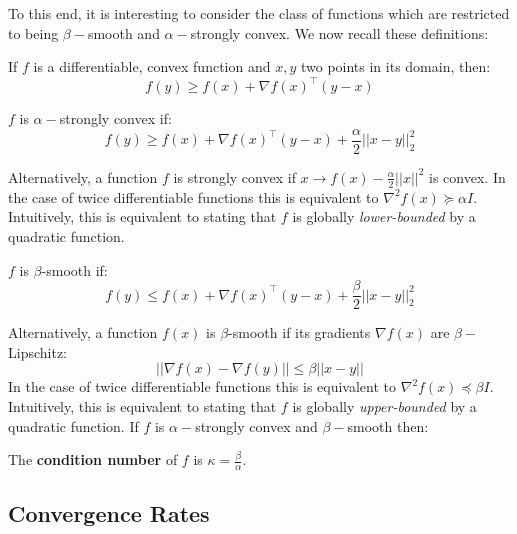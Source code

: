 To this end, it is interesting to consider the class of functions which are restricted to being $\beta-$smooth and $\alpha-$strongly convex. 
We now recall these definitions:
\begin{definition}
If $f$ is a differentiable, convex function and $x,y$ two points in its domain, then:
\begin{equation}\label{convexity_def_eq}
f(y) \geq f(x) + \nabla f(x)^\top (y-x)
\end{equation}
\end{definition}

\begin{definition}
$f$ is $\alpha-$strongly convex if:
\begin{equation}
f(y) \geq f(x) + \nabla f(x)^\top(y-x) + \frac{\alpha}{2} ||x - y||_2^2
\end{equation}
\end{definition}

Alternatively, a function $f$ is strongly convex if $x \rightarrow f(x) - \frac{\alpha}{2} ||x||^2$ is convex. In the case of twice differentiable functions this is equivalent to $\nabla^{2} f(x) \succeq \alpha I$. Intuitively, this is equivalent to stating that $f$ is globally \textit{lower-bounded} by a quadratic function. 

\begin{definition}
$f$ is $\beta$-smooth if:
\begin{equation}\label{fundamental_beta_eq}
f(y) \leq f(x) + \nabla f(x)^\top(y-x)+ \frac{\beta}{2} ||x - y||_2^2
\end{equation}
\end{definition}
Alternatively, a function $f(x)$ is $\beta$-smooth if its gradients $\nabla f(x)$ are $\beta-$Lipschitz:
\begin{equation}
    || \nabla f(x) - \nabla f(y) || \leq \beta ||x - y||
\end{equation}
In the case of twice differentiable functions this is equivalent to $\nabla^{2} f(x) \preceq \beta I$.
Intuitively, this is equivalent to stating that $f$ is globally \textit{upper-bounded} by a quadratic function.
\newline
If $f$ is $\alpha-$strongly convex and $\beta-$smooth then:
\begin{definition}
The \textbf{condition number} of $f$ is $\kappa = \frac{\beta}{\alpha}$. 
\end{definition}

\subsection{Convergence Rates}

